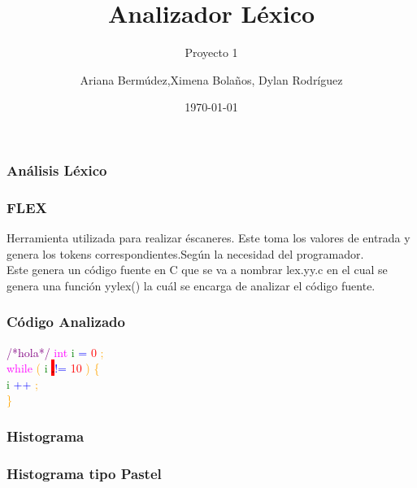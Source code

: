 \documentclass{beamer}
\title{Analizador L\'exico}
\subtitle{Proyecto 1}
\author{Ariana Berm\'udez,Ximena Bola\~nos, Dylan Rodr\'iguez}
\institute{Instituto Tecnol\'ogico de Costa Rica}
\date{\today}
\begin{document}
\begin{frame}
 \titlepage 
 \end{frame}\begin{frame}
 \frametitle{An\'alisis L\'exico}
 \end{frame}\begin{frame}
 \frametitle{FLEX}
 Herramienta utilizada para realizar \'escaneres. Este toma los valores de entrada y genera los tokens correspondientes.Seg\'un la necesidad del programador. \\ Este genera un c\'odigo fuente en C que se va a nombrar lex.yy.c en el cual se genera una funci\'on yylex() la cu\'al se encarga de analizar el c\'odigo fuente. \end{frame}\begin{frame}
\frametitle{C\'odigo Analizado}
\textcolor{purple}{/*hola*/} \textcolor{magenta}{int} \textcolor{green}{i} \textcolor{blue}{=} \textcolor{red}{0} \textcolor{orange}{;} \\ 
 \textcolor{magenta}{while} \textcolor{orange}{(} \textcolor{green}{i} \colorbox{red}{.}\textcolor{blue}{!=} \textcolor{red}{10} \textcolor{orange}{)} \textcolor{orange}{\{} \\ 
 \textcolor{green}{i} \textcolor{blue}{++} \textcolor{orange}{;} \\ 
 \textcolor{orange}{\}} \\ 
 \textcolor{white}{} \end{frame}
\begin{frame}
\frametitle{Histograma}
\end{frame}
\begin{frame}
\frametitle{Histograma tipo Pastel}
\def\angle{0}
\def\radius{3}
\def\cyclelist{{"yellow","blue","red","green"}}
\newcount\cyclecount {}
\newcount\ind {}

\end{frame}
\end{document}
